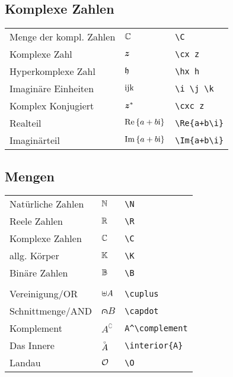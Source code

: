 \documentclass[8pt,a5paper]{scrartcl}
\begin{document}
	



	\subsection{Komplexe Zahlen}
	\begin{tabular}{lll}
		Menge der kompl. Zahlen & $\operatorname{\mathbb C}$ & \verb#\C#\\
		Komplexe Zahl & $\boldsymbol{z}$ & \verb#\cx z#\\
		Hyperkomplexe Zahl & $\mathfrak h$ & \verb#\hx h#\\
		Imaginäre Einheiten & $\mathrm{i} \mathrm{j} \mathrm{k}$ & \verb#\i \j \k#\\
		Komplex Konjugiert & $\boldsymbol z^*$ & \verb#\cxc z#\\
		Realteil & $\operatorname{Re}\left\{a+b\mathrm{i}\right\}$ & \verb#\Re{a+b\i}#\\
		Imaginärteil & $\operatorname{Im}\left\{a+b\mathrm{i}\right\}$ & \verb#\Im{a+b\i}#\\
	\end{tabular}

	

	\subsection{Mengen}
	\begin{tabular}{lll}
		Natürliche Zahlen & $\operatorname{\mathbb N}$ & \verb#\N#\\
		Reele Zahlen & $\operatorname{\mathbb R}$ & \verb#\R#\\
		Komplexe Zahlen & $\operatorname{\mathbb C}$ & \verb#\C#\\
		allg. Körper & $\operatorname{\mathbb K}$ & \verb#\K#\\ 
		Binäre Zahlen & $\operatorname{\mathbb B}$ & \verb#\B#\\ \\
		Vereinigung/OR & $\uplus A$ & \verb#\cuplus#\\
		Schnittmenge/AND & $\capdot B$ & \verb#\capdot#\\
		Komplement & $A^\complement$ & \verb#A^\complement#\\
		Das Innere & $\overset{{}_\circ}{A}$ & \verb#\interior{A}#\\
		Landau & $\operatorname{\mathcal O}$ & \verb#\O#\\
	\end{tabular}

	
\end{document}

